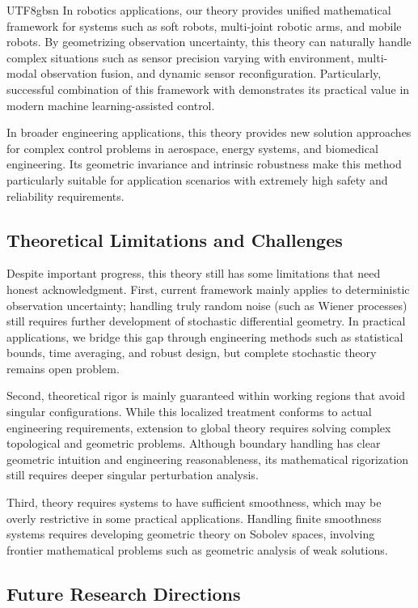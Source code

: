 \documentclass[a4paper,12pt]{extarticle}
\theoremstyle{definition}
\begin{document}
\begin{CJK}{UTF8}{gbsn}
In robotics applications, our theory provides unified mathematical framework for systems such as soft robots, multi-joint robotic arms, and mobile robots. By geometrizing observation uncertainty, this theory can naturally handle complex situations such as sensor precision varying with environment, multi-modal observation fusion, and dynamic sensor reconfiguration. Particularly, successful combination of this framework with \cite{zheng2025learning} demonstrates its practical value in modern machine learning-assisted control.

In broader engineering applications, this theory provides new solution approaches for complex control problems in aerospace, energy systems, and biomedical engineering. Its geometric invariance and intrinsic robustness make this method particularly suitable for application scenarios with extremely high safety and reliability requirements.

\subsection{Theoretical Limitations and Challenges}

Despite important progress, this theory still has some limitations that need honest acknowledgment. First, current framework mainly applies to deterministic observation uncertainty; handling truly random noise (such as Wiener processes) still requires further development of stochastic differential geometry. In practical applications, we bridge this gap through engineering methods such as statistical bounds, time averaging, and robust design, but complete stochastic theory remains open problem.

Second, theoretical rigor is mainly guaranteed within working regions that avoid singular configurations. While this localized treatment conforms to actual engineering requirements, extension to global theory requires solving complex topological and geometric problems. Although boundary handling has clear geometric intuition and engineering reasonableness, its mathematical rigorization still requires deeper singular perturbation analysis.

Third, theory requires systems to have sufficient smoothness, which may be overly restrictive in some practical applications. Handling finite smoothness systems requires developing geometric theory on Sobolev spaces, involving frontier mathematical problems such as geometric analysis of weak solutions.

\subsection{Future Research Directions}


\end{CJK}
\end{document}
